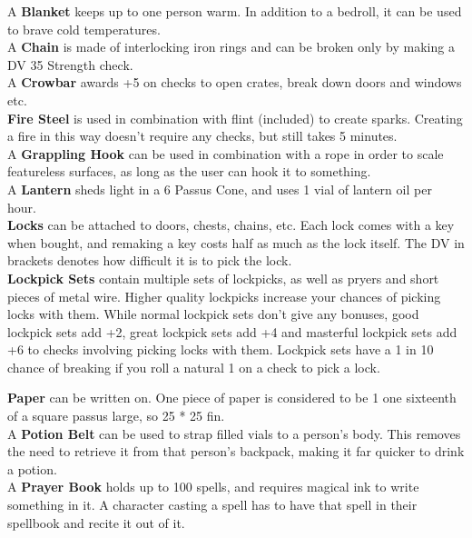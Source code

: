 A \textbf{Blanket} keeps up to one person warm. In addition to a bedroll, it can be used to brave cold temperatures.\\

A \textbf{Chain} is made of interlocking iron rings and can be broken only by making a DV 35 Strength check.\\

A \textbf{Crowbar} awards +5 on checks to open crates, break down doors and windows etc.\\

\textbf{Fire Steel} is used in combination with flint (included) to create sparks. Creating a fire in this way doesn't require any checks, but still takes 5 minutes.\\

A \textbf{Grappling Hook} can be used in combination with a rope in order to scale featureless surfaces, as long as the user can hook it to something.\\

A \textbf{Lantern} sheds light in a 6 Passus Cone, and uses 1 vial of lantern oil per hour.\\

\textbf{Locks} can be attached to doors, chests, chains, etc. Each lock comes with a key when bought, and remaking a key costs half as much as the lock itself. The DV in brackets denotes how difficult it is to pick the lock.\\

\textbf{Lockpick Sets} contain multiple sets of lockpicks, as well as pryers and short pieces of metal wire. Higher quality lockpicks increase your chances of picking locks with them. While normal lockpick sets don't give any bonuses, good lockpick sets add +2, great lockpick sets add +4 and masterful lockpick sets add +6 to checks involving picking locks with them. Lockpick sets have a 1 in 10 chance of breaking if you roll a natural 1 on a check to pick a lock.

\textbf{Paper} can be written on. One piece of paper is considered to be 1 one sixteenth of a square passus large, so 25 * 25 fin.\\

A \textbf{Potion Belt} can be used to strap filled vials to a person's body. This removes the need to retrieve it from that person's backpack, making it far quicker to drink a potion.\\
	
A \textbf{Prayer Book} holds up to 100 spells, and requires magical ink to write something in it. A character casting a spell has to have that spell in their spellbook and recite it out of it.\\

